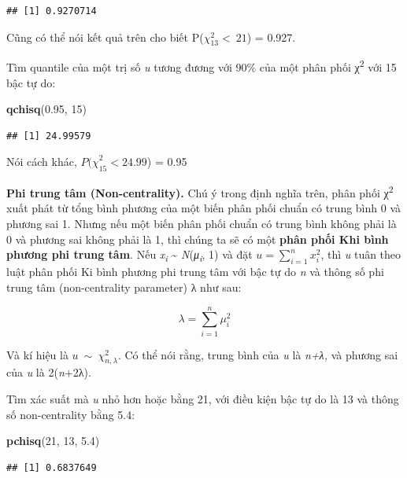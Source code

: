 \documentclass[
]{book}
\newenvironment{Shaded}{\begin{snugshade}}{\end{snugshade}}
\newcommand{\DecValTok}[1]{\textcolor[rgb]{0.00,0.00,0.81}{#1}}
\newcommand{\FloatTok}[1]{\textcolor[rgb]{0.00,0.00,0.81}{#1}}
\newcommand{\KeywordTok}[1]{\textcolor[rgb]{0.13,0.29,0.53}{\textbf{#1}}}
\newcommand{\NormalTok}[1]{#1}
\begin{document}
\begin{itemize}
\begin{verbatim}
## [1] 0.9270714
\end{verbatim}

  Cũng có thể nói kết quả trên cho biết P(\(\chi_{13}^{2} < \ 21\)) = 0.927.

  Tìm quantile của một trị số \emph{u} tương đương với 90\% của một phân phối χ\textsuperscript{2} với 15 bậc tự do:

\begin{Shaded}
\begin{Highlighting}[]
\KeywordTok{qchisq}\NormalTok{(}\FloatTok{0.95}\NormalTok{, }\DecValTok{15}\NormalTok{)}
\end{Highlighting}
\end{Shaded}

\begin{verbatim}
## [1] 24.99579
\end{verbatim}

  Nói cách khác, \({P(\chi}_{15}^{2} < 24.99\)) = 0.95

  \textbf{Phi trung tâm (Non-centrality).} Chú ý trong định nghĩa trên, phân phối χ\textsuperscript{2} xuất phát từ tổng bình phương của một biến phân phối chuẩn có trung bình 0 và phương sai 1. Nhưng nếu một biến phân phối chuẩn có trung bình không phải là 0 và phương sai không phải là 1, thì chúng ta sẽ có một \textbf{phân phối Khi bình phương phi trung tâm}. Nếu \emph{x\textsubscript{i}} \textasciitilde{} \emph{N}(\emph{μ\textsubscript{i}}, 1) và đặt \(u = \sum_{i = 1}^{n}x_{i}^{2}\), thì \emph{u} tuân theo luật phân phối Ki bình phương phi trung tâm với bậc tự do \emph{n} và thông số phi trung tâm (non-centrality parameter) λ như sau:

  \[\lambda = \sum_{i = 1}^{n}\mu_{i}^{2}\]

  Và kí hiệu là \(u\ \sim\ \chi_{n,\lambda}^{2}\). Có thể nói rằng, trung bình của \emph{u} là \emph{n+λ,} và phương sai của \emph{u} là 2(\emph{n}+2λ).

  Tìm xác suất mà \emph{u} nhỏ hơn hoặc bằng 21, với điều kiện bậc tự do là 13 và thông số non-centrality bằng 5.4:

\begin{Shaded}
\begin{Highlighting}[]
\KeywordTok{pchisq}\NormalTok{(}\DecValTok{21}\NormalTok{, }\DecValTok{13}\NormalTok{, }\FloatTok{5.4}\NormalTok{)}
\end{Highlighting}
\end{Shaded}

\begin{verbatim}
## [1] 0.6837649
\end{verbatim}


\end{itemize}
\end{document}
